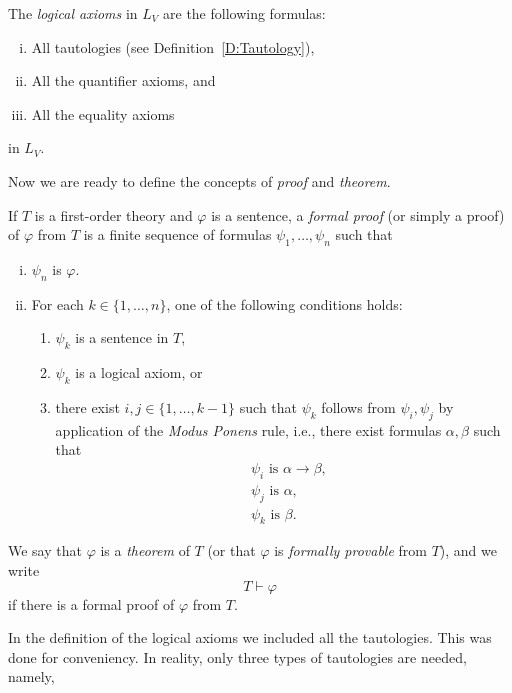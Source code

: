 \documentclass{scrartcl}
\renewcommand{\phi}{\varphi}
\begin{document}
\begin{definition}
\label{D: axioms}
The \emph{logical axioms} in $L_V$ are the following formulas:
\begin{enumerate}[i)]
\item All tautologies (see Definition~\ref{D:Tautology}),
\item All the quantifier axioms, and
\item All the equality axioms
\end{enumerate}
in $L_V$.
\end{definition}

Now we are ready to define the concepts of \emph{proof} and \emph{theorem}.

\begin{definition}
\label{D:proof}
If $T$ is a first-order theory and $\phi$ is a sentence, a \emph{formal proof} (or simply a proof) of $\phi$ from $T$ is a finite sequence of formulas $\psi_1,\dots, \psi_n$ such that
\begin{enumerate}[i)]
\item
$\psi_n$ is $\phi$.

\item	
For each $k\in\{1,\dots, n\}$, one of the following conditions holds:
\begin{enumerate}
\item 
$\psi_k$ is a sentence in $T$,
\item 
$\psi_k$ is a logical axiom, or
\item
there exist $i,j\in\{1,\dots, k-1\}$ such that $\psi_k$ follows from $\psi_i,\psi_j$ by application of the \emph{Modus Ponens} rule, i.e., there exist formulas $\alpha,\beta$ such that
\begin{align*}
&\psi_i \text{ is } \alpha\to\beta,\\
&\psi_j \text{ is } \alpha,\\
&\psi_k \text{ is } \beta.
\end{align*}
\end{enumerate}

\end{enumerate}

We say that $\phi$ is a \emph{theorem} of $T$ (or that $\phi$ is \emph{formally provable} from $T$), and we write
\[
T\vdash \phi
\]
 if there is a formal proof of $\phi$ from $T$.
\end{definition}

In the definition of the logical axioms we included all the tautologies. This was done for conveniency. In reality, only three types of tautologies are needed, namely,
\end{document}
